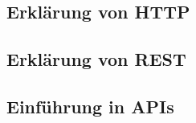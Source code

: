 \subsection{Erklärung von HTTP}
  \label{Erklärung von HTTP}
  
\pagebreak

\subsection{Erklärung von REST}
  \label{Erklärung von REST}
  
\pagebreak

\subsection{Einführung in APIs}
  \label{Einführung in APIs}
  
\pagebreak